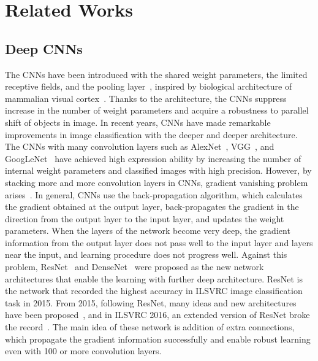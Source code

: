 \documentclass[journal]{IEEEtran}
\begin{document}
\section{Related Works}
\subsection{Deep CNNs}
The CNNs have been introduced with the shared weight parameters, the limited receptive fields, and the pooling layer~\cite{LeCun1989}, inspired by biological architecture of mammalian visual cortex~\cite{Hubel1968,Fukushima1980}.
Thanks to the architecture, the CNNs suppress increase in the number of weight parameters and acquire a robustness to parallel shift of objects in image.
In recent years, CNNs have made remarkable improvements in image classification with the deeper and deeper architecture.
The CNNs with many convolution layers such as AlexNet~\cite{Krizhevsky2012}, VGG~\cite{Simonyan2015a}, and GoogLeNet~\cite{Szegedy2014} have achieved high expression ability by increasing the number of internal weight parameters and classified images with high precision.
However, by stacking more and more convolution layers in CNNs, gradient vanishing problem arises~\cite{Schmidhuber2015}.
In general, CNNs use the back-propagation algorithm, which calculates the gradient obtained at the output layer, back-propagates the gradient in the direction from the output layer to the input layer, and updates the weight parameters.
When the layers of the network become very deep, the gradient information from the output layer does not pass well to the input layer and layers near the input, and learning procedure does not progress well.
Against this problem, ResNet~\cite{He2017} and DenseNet~\cite{Huang2016b} were proposed as the new network architectures that enable the learning with further deep architecture.
ResNet is the network that recorded the highest accuracy in ILSVRC image classification task in 2015.
From 2015, following ResNet, many ideas and new architectures have been proposed~\cite{He2016b,Zagoruyko2016,Huang2016a,Targ2016a,Han2016}, and in ILSVRC 2016, an extended version of ResNet broke the record~\cite{Zagoruyko2016}.
The main idea of these network is addition of extra connections, which propagate the gradient information successfully and enable robust learning even with 100 or more convolution layers.
\end{document}

